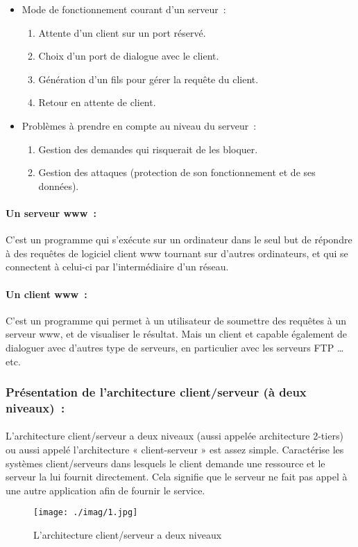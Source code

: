 \begin{itemize}{}
	\item Mode de fonctionnement courant d’un serveur :
	\begin{enumerate}
	\item Attente d’un client sur un port réservé.
	\item Choix d’un port de dialogue avec le client.
	\item Génération d’un fils pour gérer la requête du client.
	\item Retour en attente de client.
	\end{enumerate} 
	\item  Problèmes à prendre en compte au niveau du serveur :
	\begin{enumerate}
	\item Gestion des demandes qui risquerait de les bloquer.
	\item Gestion des attaques (protection de son fonctionnement et de ses données).
	\end{enumerate}	

\end{itemize}
	 
\paragraph{Un serveur www :}	
C’est un programme qui s’exécute sur un ordinateur dans le seul but de répondre à des requêtes de logiciel client www tournant sur d’autres ordinateurs, et qui se connectent à celui-ci par l’intermédiaire d’un réseau.
\paragraph{Un client www :}
C’est un programme qui permet à un utilisateur de soumettre des requêtes à un serveur www, et de visualiser le résultat. Mais un client et capable également de dialoguer avec d’autres type de serveurs, en particulier avec les serveurs FTP …etc.
\subsubsection{Présentation de l’architecture client/serveur (à deux niveaux) :}
\paragraph{}
L’architecture client/serveur a deux niveaux (aussi appelée architecture 2-tiers) ou aussi appelé l’architecture « client-serveur » est assez simple. Caractérise les systèmes client/serveurs dans lesquels le client demande une ressource et le serveur la lui fournit directement. Cela signifie que le serveur ne fait pas appel à une autre application afin de fournir le service.
\begin{figure}[h]
	\centering
	\texttt{[image: ./imag/1.jpg]}
	\caption{L’architecture client/serveur a deux niveaux}
\end{figure}
